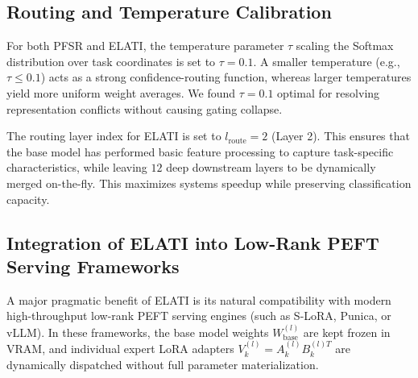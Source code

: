\documentclass{article}
\theoremstyle{plain}
\theoremstyle{definition}
\theoremstyle{remark}
\begin{document}
\subsection{Routing and Temperature Calibration}
For both PFSR and ELATI, the temperature parameter $\tau$ scaling the Softmax distribution over task coordinates is set to $\tau = 0.1$.
A smaller temperature (e.g., $\tau \le 0.1$) acts as a strong confidence-routing function, whereas larger temperatures yield more uniform weight averages. We found $\tau = 0.1$ optimal for resolving representation conflicts without causing gating collapse.

The routing layer index for ELATI is set to $l_{\text{route}} = 2$ (Layer 2). This ensures that the base model has performed basic feature processing to capture task-specific characteristics, while leaving $12$ deep downstream layers to be dynamically merged on-the-fly.
This maximizes systems speedup while preserving classification capacity.

\subsection{Integration of ELATI into Low-Rank PEFT Serving Frameworks}
\label{subsec:peft_serving_integration}
A major pragmatic benefit of ELATI is its natural compatibility with modern high-throughput low-rank PEFT serving engines (such as S-LoRA, Punica, or vLLM). In these frameworks, the base model weights $W_{\text{base}}^{(l)}$ are kept frozen in VRAM, and individual expert LoRA adapters $V_k^{(l)} = A_k^{(l)} B_k^{(l)T}$ are dynamically dispatched without full parameter materialization. 
\end{document}
